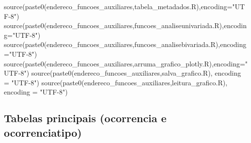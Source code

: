 \documentclass[
]{article}
\newenvironment{Shaded}{\begin{snugshade}}{\end{snugshade}}
\newcommand{\AttributeTok}[1]{\textcolor[rgb]{0.77,0.63,0.00}{#1}}
\newcommand{\FunctionTok}[1]{\textcolor[rgb]{0.00,0.00,0.00}{#1}}
\newcommand{\NormalTok}[1]{#1}
\newcommand{\StringTok}[1]{\textcolor[rgb]{0.31,0.60,0.02}{#1}}
\begin{document}
\begin{Shaded}
\begin{Highlighting}[]
\FunctionTok{source}\NormalTok{(}\FunctionTok{paste0}\NormalTok{(endereco\_funcoes\_auxiliares,}\StringTok{\textquotesingle{}tabela\_metadados.R\textquotesingle{}}\NormalTok{),}\AttributeTok{encoding=}\StringTok{"UTF{-}8"}\NormalTok{)}
\FunctionTok{source}\NormalTok{(}\FunctionTok{paste0}\NormalTok{(endereco\_funcoes\_auxiliares,}\StringTok{\textquotesingle{}funcoes\_analiseunivariada.R\textquotesingle{}}\NormalTok{),}\AttributeTok{encoding=}\StringTok{"UTF{-}8"}\NormalTok{)}
\FunctionTok{source}\NormalTok{(}\FunctionTok{paste0}\NormalTok{(endereco\_funcoes\_auxiliares,}\StringTok{\textquotesingle{}funcoes\_analisebivariada.R\textquotesingle{}}\NormalTok{),}\AttributeTok{encoding=}\StringTok{"UTF{-}8"}\NormalTok{)}
\FunctionTok{source}\NormalTok{(}\FunctionTok{paste0}\NormalTok{(endereco\_funcoes\_auxiliares,}\StringTok{\textquotesingle{}arruma\_grafico\_plotly.R\textquotesingle{}}\NormalTok{),}\AttributeTok{encoding=}\StringTok{"UTF{-}8"}\NormalTok{)}
\FunctionTok{source}\NormalTok{(}\FunctionTok{paste0}\NormalTok{(endereco\_funcoes\_auxiliares,}\StringTok{\textquotesingle{}salva\_grafico.R\textquotesingle{}}\NormalTok{), }\AttributeTok{encoding =} \StringTok{"UTF{-}8"}\NormalTok{)}
\FunctionTok{source}\NormalTok{(}\FunctionTok{paste0}\NormalTok{(endereco\_funcoes\_auxiliares,}\StringTok{\textquotesingle{}leitura\_grafico.R\textquotesingle{}}\NormalTok{), }\AttributeTok{encoding =} \StringTok{"UTF{-}8"}\NormalTok{)}
\end{Highlighting}
\end{Shaded}

\hypertarget{tabelas-principais-ocorrencia-e-ocorrenciatipo}{%
\subsection{Tabelas principais (ocorrencia e
ocorrenciatipo)}\label{tabelas-principais-ocorrencia-e-ocorrenciatipo}}
\end{document}

